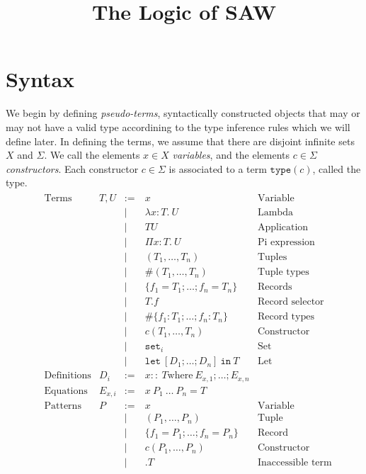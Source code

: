 \documentclass{article}
\title{The Logic of SAW}
\newcommand{\fn}[1]{\mathtt{#1}}
\newcommand{\set}[1]{\fn{set}_{#1}}
\newcommand{\lamexpr}[3]{\lambda {#1}{:}{#2}.\ {#3}}
\newcommand{\Piexpr}[3]{\Pi {#1}{:}{#2}.\ {#3}}
\newcommand{\letexpr}[2]{\fn{let}\ {#1}\ \fn{in}\ {#2}}
\begin{document}


\section{Syntax}

We begin by defining \emph{pseudo-terms}, syntactically constructed objects that
may or may not have a valid type accordining to the type inference rules which we
will define later.  In defining the terms, we assume that there are disjoint infinite
sets $X$ and $\Sigma$.  We call the elements $x \in X$ \emph{variables}, and the elements
$c \in \Sigma$ \emph{constructors}.  Each constructor $c \in \Sigma$ is associated to a
term $\fn{type}(c)$, called the type.
\begin{align*}
&\begin{array}{llrll}
\text{Terms}
& T,U    &:=\:& x & \text{Variable}\\
&        & |\:& \lamexpr{x}{T}{U} &\text{Lambda}\\
&        & |\:& T U &\text{Application}\\
&        & |\:& \Piexpr{x}{T}{U} &\text{Pi expression}\\
&        & |\:& (T_1, \dots, T_n)   & \text{Tuples}\\
&        & |\:& \#(T_1, \dots, T_n)                 & \text{Tuple types}\\
&        & |\:& \{ f_1 = T_1; \dots; f_n = T_n \}   & \text{Records}\\
&        & |\:& T.f                                & \text{Record selector}\\ 
&        & |\:& \#\{ f_1 : T_1; \dots; f_n : T_n \} & \text{Record types}\\
&        & |\:& c(T_1,\dots,T_n)                    & \text{Constructor}\\
&        & |\:& \set{i} & \text{Set}\\
&        & |\:& \letexpr{[ D_1; \dots; D_n ]}{T}    & \text{Let}\\
\text{Definitions}
&D_i     &:=\:&x ::\ T \text{where}\ E_{x,1}; \dots; E_{x,n}\\
\text{Equations}
&E_{x,i} &:=\:&x\ P_1\ \dots\ P_n = T\\
\text{Patterns}
&P       &:=\:&x & \text{Variable}\\
&        & |\:&(P_1, \dots, P_n) &\text{Tuple}\\ %
&        & |\:&\{ f_1 = P_1; \dots; f_n = P_n \} & \text{Record}\\ %
&        & |\:&c(P_1, \dots, P_n) & \text{Constructor}\\ %
&        & |\:&.T & \text{Inaccessible term}\\
\end{array}\\
\end{align*}
\end{document}
